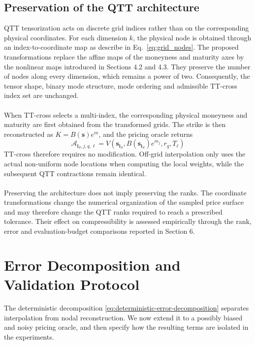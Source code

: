 \documentclass{article}
\numberwithin{equation}{subsection}
\theoremstyle{definition}
\theoremstyle{remark}
\begin{document}
\subsection{Preservation of the QTT architecture}
QTT tensorization acts on discrete grid indices rather than on the corresponding physical coordinates. For each dimension \(k\), the physical node is obtained through an index-to-coordinate map as describe in Eq.~\eqref{eq:grid_nodes}. 
The proposed transformations replace the affine maps of the moneyness and maturity axes by the nonlinear maps introduced in Sections 4.2 and 4.3. They preserve the number of nodes along every dimension, which remains a power of two. Consequently, the tensor shape, binary mode structure, mode ordering and admissible TT-cross index set are unchanged.\\
\\
When TT-cross selects a multi-index, the corresponding physical moneyness and maturity are first obtained from the transformed grids. The strike is then reconstructed as \(K=B(\boldsymbol{s})e^m\), and the pricing oracle returns
\begin{equation}
\mathcal{A}_{\boldsymbol{i}_S,j,q,\ell}
=
V
\left(
\boldsymbol{s}_{\boldsymbol{i}_S},
B(\boldsymbol{s}_{\boldsymbol{i}_S})e^{m_j},
r_q,
T_\ell
\right)
\end{equation}
TT-cross therefore requires no modification. Off-grid interpolation only uses the actual non-uniform node locations when computing the local weights, while the subsequent QTT contractions remain identical.\\
\\
Preserving the architecture does not imply preserving the ranks. The coordinate transformations change the numerical organization of the sampled price surface and may therefore change the QTT ranks required to reach a prescribed tolerance. Their effect on compressibility is assessed empirically through the rank, error and evaluation-budget comparisons reported in Section 6.
\section{Error Decomposition and Validation Protocol}
\label{sec:error-validation}
The deterministic decomposition
\eqref{eq:deterministic-error-decomposition} separates interpolation from
nodal reconstruction. We now extend it to a possibly biased and noisy pricing
oracle, and then specify how the resulting terms are isolated in the
experiments.
\end{document}
